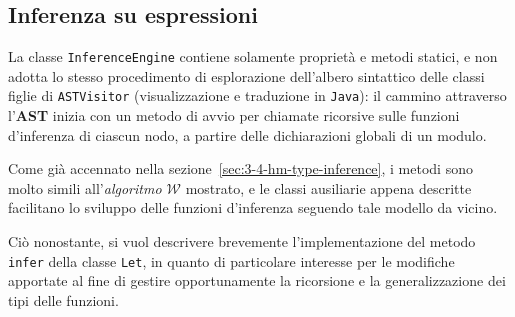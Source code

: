 \subsection{Inferenza su espressioni}
\label{sec:5-9-expression-inference}

La classe \texttt{InferenceEngine} contiene solamente proprietà e metodi statici, e non adotta lo stesso
procedimento di esplorazione dell'albero sintattico delle classi figlie di \texttt{ASTVisitor}
(visualizzazione e traduzione in \texttt{Java}): il cammino attraverso l'\textbf{AST} inizia con un metodo
di avvio per chiamate ricorsive sulle funzioni d'inferenza di ciascun nodo,
a partire delle dichiarazioni globali di un modulo.


Come già accennato nella sezione~\ref{sec:3-4-hm-type-inference}, i metodi sono molto simili all'\textit{algoritmo $\mathcal{W}$} mostrato,
e le classi ausiliarie appena descritte facilitano lo sviluppo delle funzioni d'inferenza seguendo tale modello da vicino.

\noindent Ciò nonostante, si vuol descrivere brevemente l'implementazione del metodo \texttt{infer} della classe \texttt{Let},
in quanto di particolare interesse per le modifiche apportate al fine di gestire opportunamente
la ricorsione e la generalizzazione dei tipi delle funzioni.

